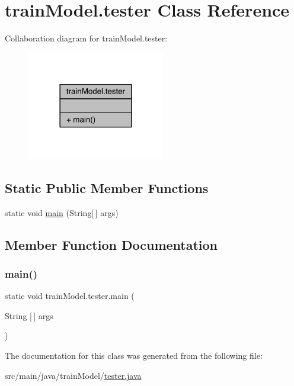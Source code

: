 \hypertarget{classtrainModel_1_1tester}{}\section{train\+Model.\+tester Class Reference}
\label{classtrainModel_1_1tester}


Collaboration diagram for train\+Model.\+tester\+:
\nopagebreak
\begin{figure}[H]
\begin{center}
\leavevmode
\includegraphics[width=170pt]{classtrainModel_1_1tester__coll__graph}
\end{center}
\end{figure}
\subsection*{Static Public Member Functions}
\begin{DoxyCompactItemize}
\item 
static void \hyperlink{classtrainModel_1_1tester_afd279d1cabc1e22c8e7c537266f3b0ad}{main} (String\mbox{[}$\,$\mbox{]} args)
\end{DoxyCompactItemize}


\subsection{Member Function Documentation}
\mbox{\label{classtrainModel_1_1tester_afd279d1cabc1e22c8e7c537266f3b0ad}} 
\subsubsection{\texorpdfstring{main()}{main()}}
{\footnotesize\ttfamily static void train\+Model.\+tester.\+main (\begin{DoxyParamCaption}\item[{String \mbox{[}$\,$\mbox{]}}]{args }\end{DoxyParamCaption})\hspace{0.3cm}{\ttfamily [static]}}



The documentation for this class was generated from the following file\+:\begin{DoxyCompactItemize}
\item 
src/main/java/train\+Model/\hyperlink{tester_8java}{tester.\+java}\end{DoxyCompactItemize}
